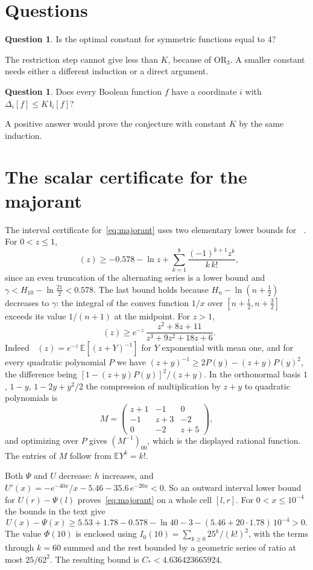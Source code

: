 \documentclass[11pt]{amsart}
\theoremstyle{definition}
\newtheorem{question}[theorem]{Question}
\theoremstyle{remark}
\newcommand{\E}{\mathbb E}
\newcommand{\I}{\mathsf I}
\DeclareMathOperator{\Ei}{E_1}
\begin{document}
\section{Questions}

\begin{question}
Is the optimal constant for symmetric functions equal to $4$?
\end{question}

The restriction step cannot give less than $K$, because of $\mathrm{OR}_3$. A smaller constant needs either a different induction or a direct argument.

\begin{question}
Does every Boolean function $f$ have a coordinate $i$ with $\Delta_i[f]\le K\,\I_i[f]$?
\end{question}

A positive answer would prove the conjecture with constant $K$ by the same induction.

\appendix
\section{The scalar certificate for the majorant}\label{app:cert}

The interval certificate for~\eqref{eq:majorant} uses two elementary lower bounds for $\Ei$. For $0<z\le1$,
\[
 \Ei(z)\ge-0.578-\ln z+\sum_{k=1}^{8}\frac{(-1)^{k+1}z^k}{k\,k!},
\]
since an even truncation of the alternating series is a lower bound and $\gamma<H_{10}-\ln\frac{21}2<0.578$. The last bound holds because $H_n-\ln(n+\frac12)$ decreases to $\gamma$: the integral of the convex function $1/x$ over $[n+\frac12,n+\frac32]$ exceeds its value $1/(n+1)$ at the midpoint. For $z>1$,
\[
 \Ei(z)\ge e^{-z}\,\frac{z^2+8z+11}{z^3+9z^2+18z+6}.
\]
Indeed $\Ei(z)=e^{-z}\,\E[(z+Y)^{-1}]$ for $Y$ exponential with mean one, and for every quadratic polynomial $P$ we have $(z+y)^{-1}\ge2P(y)-(z+y)P(y)^2$, the difference being $[1-(z+y)P(y)]^2/(z+y)$. In the orthonormal basis $1$, $1-y$, $1-2y+y^2/2$ the compression of multiplication by $z+y$ to quadratic polynomials is
\[
 M=\begin{pmatrix}z+1&-1&0\\-1&z+3&-2\\0&-2&z+5\end{pmatrix},
\]
and optimizing over $P$ gives $(M^{-1})_{00}$, which is the displayed rational function. The entries of $M$ follow from $\E Y^k=k!$.

Both $\Psi$ and $U$ decrease: $h$ increases, and $U'(x)=-e^{-40x}/x-5.46-35.6\,e^{-20x}<0$. So an outward interval lower bound for $U(r)-\Psi(l)$ proves~\eqref{eq:majorant} on a whole cell $[l,r]$. For $0<x\le10^{-4}$ the bounds in the text give
\[
 U(x)-\Psi(x)\ge5.53+1.78-0.578-\ln40-3-(5.46+20\cdot1.78)\,10^{-4}>0.
\]
The value $\Phi(10)$ is enclosed using $I_0(10)=\sum_{k\ge0}25^k/(k!)^2$, with the terms through $k=60$ summed and the rest bounded by a geometric series of ratio at most $25/62^2$. The resulting bound is $C_*<4.636423665924$.
\end{document}
